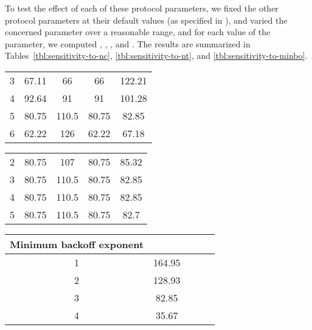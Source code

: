 \documentclass[12pt, draftclsnofoot, onecolumn]{IEEEtran}
\begin{document}
To test the effect of each of these protocol parameters, we fixed the other protocol parameters at their default values (as specified in \cite{IEEE}), and varied the concerned parameter over a reasonable range, and for each value of the parameter, we computed , , , and . The results are summarized in Tables~\ref{tbl:sensitivity-to-nc}, \ref{tbl:sensitivity-to-nt}, and \ref{tbl:sensitivity-to-minbo}. 

\begin{table*}[ht]
  \centering
\caption{Variation of the bounds with , keeping the other protocol parameters fixed at their default values}
\label{tbl:sensitivity-to-nc}
\footnotesize
  \begin{tabular}{|c|c|c|c|c|}\hline
     &  &  &  & \\
 \hline
    3 & 67.11 & 66 & 66 & 122.21\\
 \hline
    4 & 92.64 & 91 &	91	& 101.28\\
 \hline
    5 & 80.75 & 110.5 & 80.75 & 82.85\\
\hline
    6 & 62.22 & 126 & 62.22 &	67.18\\
\hline
\end{tabular}
\normalsize
\end{table*}  

\begin{table*}[ht]
  \centering
\caption{Variation of the bounds with , keeping the other protocol parameters fixed at their default values}
\label{tbl:sensitivity-to-nt}
\footnotesize
  \begin{tabular}{|c|c|c|c|c|}\hline
     &  &  &  & \\
 \hline
    2 & 80.75 & 107 & 80.75 & 85.32\\
 \hline
    3 & 80.75 & 110.5 &	80.75 & 82.85\\
 \hline
    4 & 80.75 & 110.5 & 80.75 & 82.85\\
\hline
    5 & 80.75 & 110.5 & 80.75 & 82.7\\
\hline
\end{tabular}
\normalsize
\end{table*}  

\begin{table*}[ht]
  \centering
\caption{Variation of the  with minimum backoff exponent, keeping the other protocol parameters fixed at their default values}
\label{tbl:sensitivity-to-minbo}
\footnotesize
  \begin{tabular}{|c|c|c|c|c|}\hline
    Minimum backoff exponent & \\
 \hline
    1 & 164.95\\
 \hline
    2 & 128.93\\
 \hline
    3 & 82.85\\
\hline
    4 & 35.67\\
\hline
\end{tabular}
\normalsize
\end{table*} 
\end{document}
